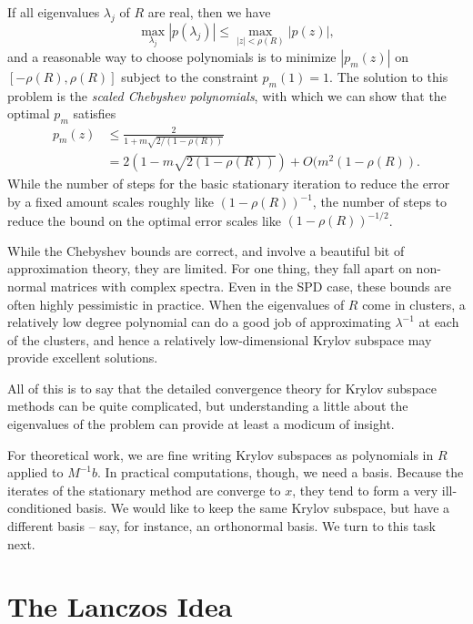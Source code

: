 \documentclass[12pt, leqno]{article}
\begin{document}
If all eigenvalues $\lambda_j$ of $R$ are real, then we have
\[
  \max_{\lambda_j} |p(\lambda_j)| \leq \max_{|z|<\rho(R)} |p(z)|,
\]
and a reasonable way to choose polynomials is to minimize $|p_m(z)|$
on $[-\rho(R),\rho(R)]$ subject to the constraint $p_m(1) = 1$.  The
solution to this problem is the {\em scaled Chebyshev polynomials},
with which we can show that the optimal $p_m$ satisfies
\begin{align*}
  p_m(z)
  & \leq \frac{2}{1+m\sqrt{2/(1-\rho(R))}} \\
  & = 2(1-m\sqrt{2(1-\rho(R))}) + O(m^2(1-\rho(R)).
\end{align*}
While the number of steps for the basic stationary iteration to
reduce the error by a fixed amount scales roughly like
$(1-\rho(R))^{-1}$, the number of steps to reduce the bound on the
optimal error scales like $(1-\rho(R))^{-1/2}$.

While the Chebyshev bounds are correct, and involve a beautiful bit of
approximation theory, they are limited.  For one thing, they fall
apart on non-normal matrices with complex spectra.  Even in the SPD
case, these bounds are often highly pessimistic in practice.  When the
eigenvalues of $R$ come in clusters, a relatively low degree
polynomial can do a good job of approximating $\lambda^{-1}$ at each
of the clusters, and hence a relatively low-dimensional Krylov
subspace may provide excellent solutions.

All of this is to say that the detailed convergence theory for Krylov
subspace methods can be quite complicated, but understanding a little
about the eigenvalues of the problem can provide at least a modicum of
insight.

For theoretical work, we are fine writing Krylov subspaces as
polynomials in $R$ applied to $M^{-1} b$.  In practical computations,
though, we need a basis.  Because the iterates of the stationary
method are converge to $x$, they tend to form a very ill-conditioned
basis.  We would like to keep the same Krylov subspace, but have a
different basis -- say, for instance, an orthonormal basis.  We turn
to this task next.

\section*{The Lanczos Idea}
\end{document}
